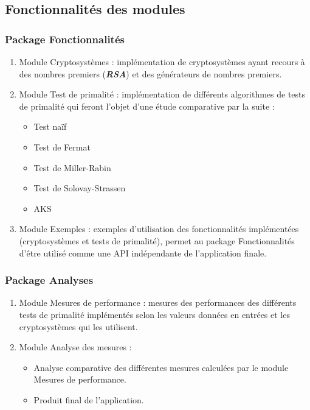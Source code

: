 	
	\subsection{Fonctionnalités des modules}
		\subsubsection*{Package Fonctionnalités}
			\begin{enumerate}[leftmargin=*]
				\item Module Cryptosystèmes : implémentation de cryptosystèmes ayant recours à des nombres premiers (\textbf{\textit{RSA}}) et des générateurs de nombres premiers.
				\item Module Test de primalité : implémentation de différents algorithmes de tests de primalité qui feront l'objet d'une étude comparative par la suite :
				\begin{itemize}
					\item Test naïf
					\item Test de Fermat
					\item Test de Miller-Rabin
					\item Test de Solovay-Strassen
					\item AKS
				\end{itemize}
				\item Module Exemples : exemples d'utilisation des fonctionnalités implémentées (cryptosystèmes et tests de primalité), permet au package Fonctionnalités d'être utilisé comme une API indépendante de l'application finale.
			\end{enumerate}
			
			\subsubsection*{Package Analyses}
			\begin{enumerate}[leftmargin=*]
				\item Module Mesures de performance : mesures des performances des différents tests de primalité implémentés selon les valeurs données en entrées et les cryptosystèmes qui les utilisent.
				\item Module Analyse des mesures :
				\begin{itemize}[leftmargin=0.2cm]
					\item Analyse comparative des différentes mesures calculées par le module Mesures de performance.
					\item Produit final de l'application.
				\end{itemize}
			\end{enumerate}
	
